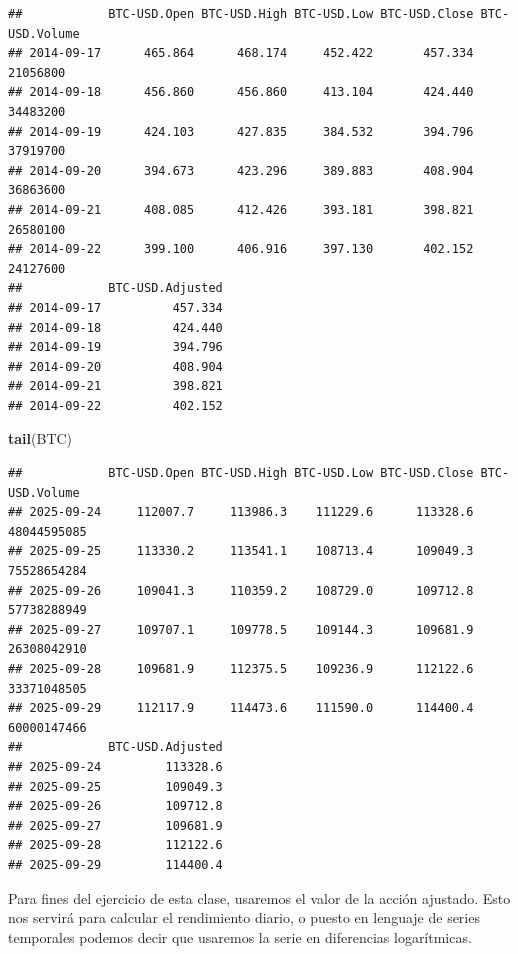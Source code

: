\documentclass[
]{book}
\newenvironment{Shaded}{\begin{snugshade}}{\end{snugshade}}
\newcommand{\AttributeTok}[1]{\textcolor[rgb]{0.13,0.29,0.53}{#1}}
\newcommand{\FunctionTok}[1]{\textcolor[rgb]{0.13,0.29,0.53}{\textbf{#1}}}
\newcommand{\NormalTok}[1]{#1}
\newcommand{\SpecialCharTok}[1]{\textcolor[rgb]{0.81,0.36,0.00}{\textbf{#1}}}
\newcommand{\StringTok}[1]{\textcolor[rgb]{0.31,0.60,0.02}{#1}}
\begin{document}
\begin{verbatim}
##            BTC-USD.Open BTC-USD.High BTC-USD.Low BTC-USD.Close BTC-USD.Volume
## 2014-09-17      465.864      468.174     452.422       457.334       21056800
## 2014-09-18      456.860      456.860     413.104       424.440       34483200
## 2014-09-19      424.103      427.835     384.532       394.796       37919700
## 2014-09-20      394.673      423.296     389.883       408.904       36863600
## 2014-09-21      408.085      412.426     393.181       398.821       26580100
## 2014-09-22      399.100      406.916     397.130       402.152       24127600
##            BTC-USD.Adjusted
## 2014-09-17          457.334
## 2014-09-18          424.440
## 2014-09-19          394.796
## 2014-09-20          408.904
## 2014-09-21          398.821
## 2014-09-22          402.152
\end{verbatim}

\begin{Shaded}
\begin{Highlighting}[]
\FunctionTok{tail}\NormalTok{(BTC)}
\end{Highlighting}
\end{Shaded}

\begin{verbatim}
##            BTC-USD.Open BTC-USD.High BTC-USD.Low BTC-USD.Close BTC-USD.Volume
## 2025-09-24     112007.7     113986.3    111229.6      113328.6    48044595085
## 2025-09-25     113330.2     113541.1    108713.4      109049.3    75528654284
## 2025-09-26     109041.3     110359.2    108729.0      109712.8    57738288949
## 2025-09-27     109707.1     109778.5    109144.3      109681.9    26308042910
## 2025-09-28     109681.9     112375.5    109236.9      112122.6    33371048505
## 2025-09-29     112117.9     114473.6    111590.0      114400.4    60000147466
##            BTC-USD.Adjusted
## 2025-09-24         113328.6
## 2025-09-25         109049.3
## 2025-09-26         109712.8
## 2025-09-27         109681.9
## 2025-09-28         112122.6
## 2025-09-29         114400.4
\end{verbatim}

Para fines del ejercicio de esta clase, usaremos el valor de la acción ajustado. Esto nos servirá para calcular el rendimiento diario, o puesto en lenguaje de series temporales podemos decir que usaremos la serie en diferencias logarítmicas.

\begin{Shaded}
\end{Shaded}
\end{document}
